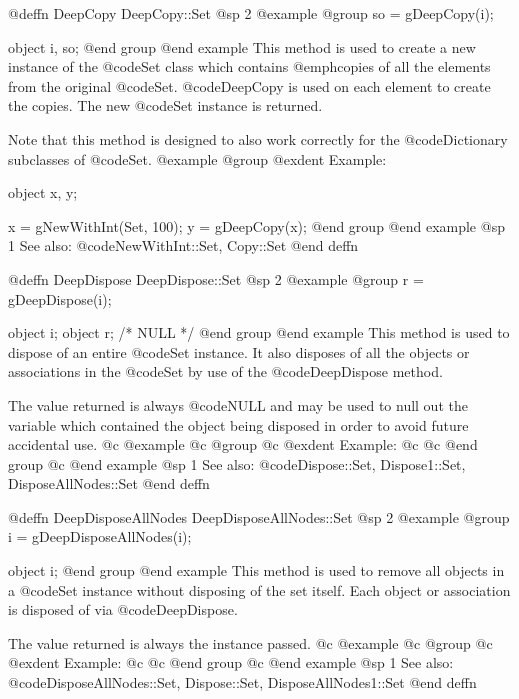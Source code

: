 @deffn {DeepCopy} DeepCopy::Set
@sp 2
@example
@group
so = gDeepCopy(i);

object  i, so;
@end group
@end example
This method is used to create a new instance of the @code{Set} class
which contains @emph{copies} of all the elements from the original @code{Set}.
@code{DeepCopy} is used on each element to create the copies.
The new @code{Set} instance is returned.

Note that this method is designed to also work correctly for the
@code{Dictionary} subclasses of @code{Set}.
@example
@group
@exdent Example:

object  x, y;

x = gNewWithInt(Set, 100);
y = gDeepCopy(x);
@end group
@end example
@sp 1
See also:  @code{NewWithInt::Set, Copy::Set}
@end deffn








@deffn {DeepDispose} DeepDispose::Set
@sp 2
@example
@group
r = gDeepDispose(i);

object  i;
object  r;     /*  NULL  */
@end group
@end example
This method is used to dispose of an entire @code{Set} instance.  It also
disposes of all the objects or associations in the @code{Set} by use of the
@code{DeepDispose} method.  

The value returned is always @code{NULL} and may be used to null out
the variable which contained the object being disposed in order to
avoid future accidental use.
@c @example
@c @group
@c @exdent Example:
@c 
@c @end group
@c @end example
@sp 1
See also:  @code{Dispose::Set, Dispose1::Set, DisposeAllNodes::Set}
@end deffn











@deffn {DeepDisposeAllNodes} DeepDisposeAllNodes::Set
@sp 2
@example
@group
i = gDeepDisposeAllNodes(i);

object  i;
@end group
@end example
This method is used to remove all objects in a @code{Set} instance
without disposing of the set itself.  Each object or association
is disposed of via @code{DeepDispose}.

The value returned is always the instance passed.
@c @example
@c @group
@c @exdent Example:
@c 
@c @end group
@c @end example
@sp 1
See also:  @code{DisposeAllNodes::Set, Dispose::Set, DisposeAllNodes1::Set}
@end deffn





















